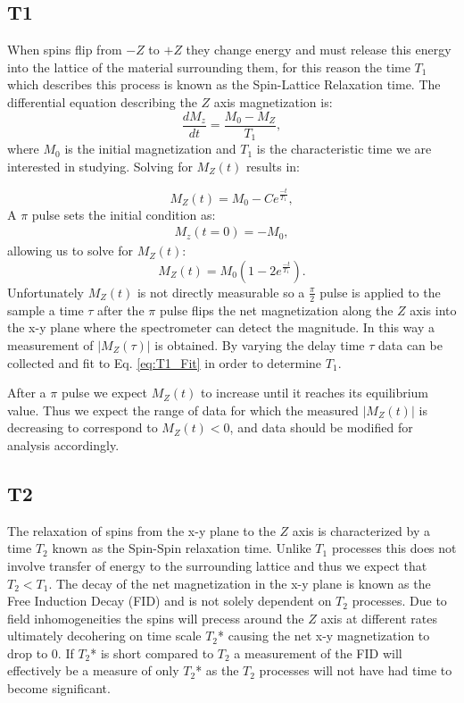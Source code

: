 \documentclass[11pt,letterpaper]{article}
\begin{document}
\subsection{T1}
\label{sub:T1_Theory}
When spins flip from $-Z$ to $+Z$ they change energy and must release this energy into the lattice of the material surrounding them, for this reason the time $T_1$ which describes this process is known as the Spin-Lattice Relaxation time. The differential equation describing the $Z$ axis magnetization is:
\begin{equation}
	\frac{dM_z}{dt}=\frac{M_0 - M_Z}{T_1},
\end{equation}
where $M_0$ is the initial magnetization and $T_1$ is the characteristic time we are interested in studying.
Solving for $M_Z(t)$ results in:

\begin{equation}
\label{eq:T1_Fit}
	M_Z(t) = M_0-Ce^{\frac{-t}{T_1}},
\end{equation}
A $\pi$ pulse sets the initial condition as:
\begin{align*}
	M_z(t=0)=-M_0,
\end{align*}
allowing us to solve for $M_Z(t)$:
\begin{equation}
\label{eq:Mz}
	M_Z(t) = M_0(1-2e^{\frac{-t}{T_1}}).
\end{equation}
Unfortunately $M_Z(t)$ is not directly measurable so a $\frac{\pi}{2}$ pulse is applied to the sample a time $\tau$ after the $\pi$ pulse flips the net magnetization along the $Z$ axis into the x-y plane where the spectrometer can detect the magnitude. In this way a measurement of $|M_Z(\tau)|$ is obtained. By varying the delay time $\tau$ data can be collected and fit to Eq. \ref{eq:T1_Fit} in order to determine $T_1$. 

After a $\pi$ pulse we expect $M_Z(t)$ to increase until it reaches its equilibrium value. Thus we expect the range of data for which the measured $|M_Z(t)|$ is decreasing to correspond to $M_Z(t)<0$, and data should be modified for analysis accordingly.

\subsection{T2}
\label{sub:T2_Theory}
The relaxation of spins from the x-y plane to the $Z$ axis is characterized by a time $T_2$ known as the Spin-Spin relaxation time. Unlike $T_1$ processes this does not involve transfer of energy to the surrounding lattice and thus we expect that $T_2<T_1$. The decay of the net magnetization in the x-y plane is known as the Free Induction Decay (FID) and is not solely dependent on $T_2$ processes. Due to field inhomogeneities the spins will precess around the $Z$ axis at different rates ultimately decohering on time scale $T_2$* causing the net x-y magnetization to drop to 0. If $T_2$* is short compared to $T_2$ a measurement of the FID will effectively be a measure of only $T_2$* as the $T_2$ processes will not have had time to become significant.
\end{document}
